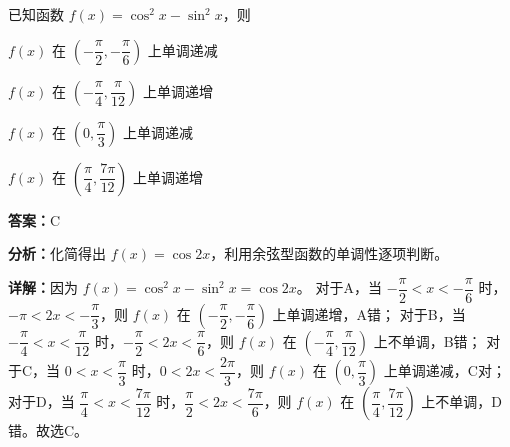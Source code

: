\begin{question}[points=4]
已知函数 $f(x) = \cos^2 x - \sin^2 x$，则
\begin{choices}
  \item $f(x)$ 在 $\left(-\dfrac{\pi}{2}, -\dfrac{\pi}{6}\right)$ 上单调递减
  \item $f(x)$ 在 $\left(-\dfrac{\pi}{4}, \dfrac{\pi}{12}\right)$ 上单调递增
  \item $f(x)$ 在 $\left(0, \dfrac{\pi}{3}\right)$ 上单调递减
  \item $f(x)$ 在 $\left(\dfrac{\pi}{4}, \dfrac{7\pi}{12}\right)$ 上单调递增
\end{choices}
\begin{solution}
\textbf{答案：}C

\textbf{分析：}化简得出 $f(x) = \cos 2x$，利用余弦型函数的单调性逐项判断。

\textbf{详解：}因为 $f(x) = \cos^2 x - \sin^2 x = \cos 2x$。
对于A，当 $-\dfrac{\pi}{2} < x < -\dfrac{\pi}{6}$ 时，$-\pi < 2x < -\dfrac{\pi}{3}$，则 $f(x)$ 在 $\left(-\dfrac{\pi}{2}, -\dfrac{\pi}{6}\right)$ 上单调递增，A错；
对于B，当 $-\dfrac{\pi}{4} < x < \dfrac{\pi}{12}$ 时，$-\dfrac{\pi}{2} < 2x < \dfrac{\pi}{6}$，则 $f(x)$ 在 $\left(-\dfrac{\pi}{4}, \dfrac{\pi}{12}\right)$ 上不单调，B错；
对于C，当 $0 < x < \dfrac{\pi}{3}$ 时，$0 < 2x < \dfrac{2\pi}{3}$，则 $f(x)$ 在 $\left(0, \dfrac{\pi}{3}\right)$ 上单调递减，C对；
对于D，当 $\dfrac{\pi}{4} < x < \dfrac{7\pi}{12}$ 时，$\dfrac{\pi}{2} < 2x < \dfrac{7\pi}{6}$，则 $f(x)$ 在 $\left(\dfrac{\pi}{4}, \dfrac{7\pi}{12}\right)$ 上不单调，D错。故选C。
\end{solution}
\end{question}

